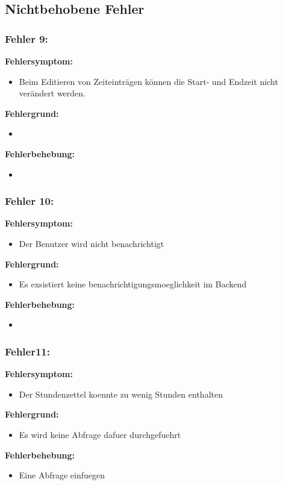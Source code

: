 \newpage

\subsection{Nichtbehobene Fehler}

\subsubsection{Fehler 9:}%
\textbf{Fehlersymptom:}
	\begin{itemize}
		\item Beim Editieren von Zeiteinträgen können die Start- und Endzeit nicht verändert werden.
	\end{itemize}
\textbf{Fehlergrund:}
	\begin{itemize}
		\item 
	\end{itemize}
\textbf{Fehlerbehebung:}
	\begin{itemize}
		\item 
	\end{itemize}
	
\subsubsection{Fehler 10:}%
\textbf{Fehlersymptom:}
	\begin{itemize}
		\item Der Benutzer wird nicht benachrichtigt
	\end{itemize}
\textbf{Fehlergrund:}
	\begin{itemize}
		\item Es exsistiert keine benachrichtigungsmoeglichkeit im Backend
	\end{itemize}
\textbf{Fehlerbehebung:}
	\begin{itemize}
		\item 
	\end{itemize}
	
\subsubsection{Fehler11:}%
\textbf{Fehlersymptom:}
	\begin{itemize}
		\item Der Stundenzettel koennte zu wenig Stunden enthalten
	\end{itemize}
\textbf{Fehlergrund:}
	\begin{itemize}
		\item Es wird keine Abfrage dafuer durchgefuehrt
	\end{itemize}
\textbf{Fehlerbehebung:}
	\begin{itemize}
		\item Eine Abfrage einfuegen
	\end{itemize}
	
